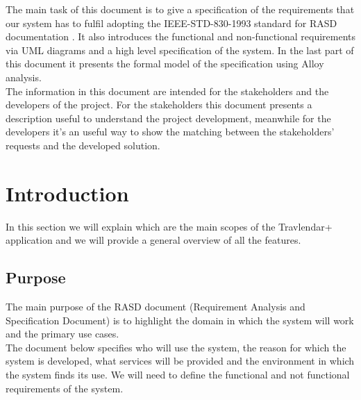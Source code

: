 \documentclass[numbers=noenddot, 12pt, a4paper, oneside]{scrbook}
\begin{document}
The main task of this document is to give a specification of the requirements that our system has to fulfil adopting the IEEE-STD-830-1993 standard for RASD documentation . It also introduces the functional and non-functional requirements via UML diagrams and a high level specification of the system. In the last part of this document it presents the formal model of the specification using Alloy analysis. \\

The information in this document are intended for the stakeholders and the developers of the project. For the stakeholders this document presents a description useful to understand the project development, meanwhile for the developers it’s an useful way to show the matching between the stakeholders’ requests and the developed solution.

\newpage

\chapter{Introduction}

In this section we will explain which are the main scopes of the Travlendar+ application and we will provide a general overview of all the features.

\section{Purpose}

The main purpose of the RASD document (Requirement Analysis and Specification Document) is to highlight the domain in which the system will work and the primary use cases.\\

The document below specifies who will use the system, the reason for which the system is developed, what services will be provided and the environment in which the system finds its use.
We will need to define the functional and not functional requirements of the system. \\
\end{document}
